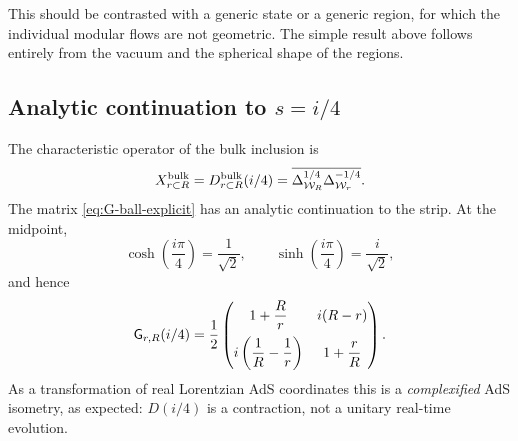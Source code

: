 \documentclass[a4paper,11pt]{article}
\theoremstyle{definition}
\begin{document}
This should be contrasted with a generic state or a generic region, for
which the individual modular flows are not geometric. The simple result
above follows entirely from the vacuum and the spherical shape of the
regions.

\subsection{Analytic continuation to \texorpdfstring{$s=i/4$}{s=i/4}}

The characteristic operator of the bulk inclusion is
\begin{equation}
    X^{\rm bulk}_{r\subset R}
    =
    D^{\rm bulk}_{r\subset R}(i/4)
    =
    \overline{
    \Delta_{\mathcal W_R}^{1/4}
    \Delta_{\mathcal W_r}^{-1/4}
    }.
    \label{eq:bulk-X-quarter}
\end{equation}
The matrix \eqref{eq:G-ball-explicit} has an analytic continuation to the
strip. At the midpoint,
\begin{equation}
    \cosh\left(\frac{i\pi}{4}\right)
    =
    \frac1{\sqrt2},
    \qquad
    \sinh\left(\frac{i\pi}{4}\right)
    =
    \frac{i}{\sqrt2},
\end{equation}
and hence
\begin{equation}
    {\sf G}_{r,R}(i/4)
    =
    \frac12
    \begin{pmatrix}
        1+\dfrac{R}{r}
        &
        i(R-r)
        \\[3mm]
        i\left(\dfrac1R-\dfrac1r\right)
        &
        1+\dfrac{r}{R}
    \end{pmatrix}.
    \label{eq:G-quarter-lorentzian}
\end{equation}
As a transformation of real Lorentzian AdS coordinates this is a
\emph{complexified} AdS isometry, as expected: $D(i/4)$ is a contraction,
not a unitary real-time evolution.
\end{document}
